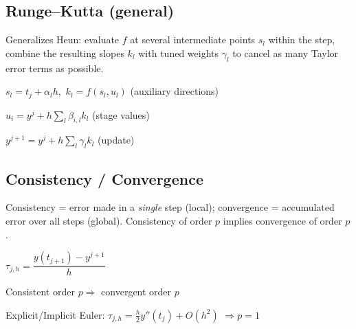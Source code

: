 \documentclass[11pt]{extarticle}
\begin{document}
\subsection{Runge--Kutta (general)}
Generalizes Heun: evaluate $f$ at several intermediate points $s_l$ within the step, combine the resulting slopes $k_l$ with tuned weights $\gamma_l$ to cancel as many Taylor error terms as possible.

$s_l=t_j+\alpha_lh$,\ $k_l=f(s_l,u_l)$ \quad (auxiliary directions)

$u_i=y^j+h\sum_l\beta_{i,l}k_l$ \quad (stage values)

$y^{j+1}=y^j+h\sum_l\gamma_lk_l$ \quad (update)

\subsection{Consistency / Convergence}
Consistency = error made in a \emph{single} step (local); convergence = accumulated error over all steps (global). Consistency of order $p$ implies convergence of order $p$.

$\tau_{j,h}=\dfrac{y(t_{j+1})-y^{j+1}}{h}$

Consistent order $p\Rightarrow$ convergent order $p$

Explicit/Implicit Euler: $\tau_{j,h}=\tfrac h2y''(t_j)+O(h^2)$ $\Rightarrow p=1$
\end{document}
